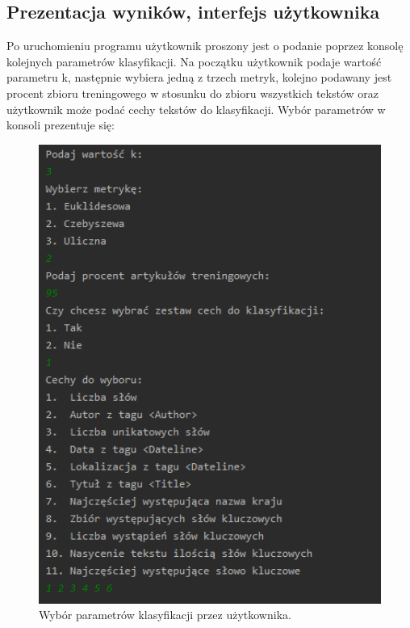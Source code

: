 \documentclass{classrep}
\begin{document}
\newpage


\subsection{Prezentacja wyników, interfejs użytkownika} 

Po uruchomieniu programu użytkownik proszony jest o podanie poprzez konsolę kolejnych parametrów klasyfikacji. Na początku użytkownik podaje wartość parametru k, następnie wybiera jedną z trzech metryk, kolejno podawany jest procent zbioru treningowego w stosunku do zbioru wszystkich tekstów oraz użytkownik może podać cechy tekstów do klasyfikacji. Wybór parametrów w konsoli prezentuje się:

\begin{figure}[h!]
 \centering
 \includegraphics[width=14cm]{Wybor.png}
 \vspace{-0.3cm}
 \caption{Wybór parametrów klasyfikacji przez użytkownika. }
 \label{Wybór parametrów klasyfikacji przez użytkownika. }
\end{figure}
\end{document}
